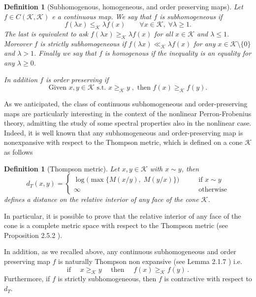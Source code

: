 \documentclass{article}
\newtheorem{definition}[theorem]{Definition}
\newcommand{\cone}{\mathcal{K}}
\newcommand{\distT}{d_T}
\newcommand{\cgeq}{\geq_{\cone}}
\newcommand{\cleq}{\leq_{\cone}}
\newcommand{\cll}{\ll_{\cone}}
\begin{document}
\begin{definition}[Subhomogenous, homogeneous, and order preserving maps]
Let $f\in C(\cone,\cone)$ e a continuous map. We say that $f$ is subhomogeneous if 
    $$f(\lambda x)\cleq \lambda f(x) \qquad \forall x\in \cone,\;\forall \lambda\geq 1.$$
    The last is equivalent to ask $f(\lambda x)\cgeq \lambda f(x)$ for all $x\in \cone$ and $\lambda\leq 1$. Moreover $f$ is strictly subhomogeneous if $f(\lambda x) \cll \lambda f(x)$ for any $x\in \cone\setminus\{0\}$ and $\lambda>1$. Finally we say that $f$ is homogenous if the inequality is an equality for any $\lambda\geq0$.

    In addition $f$ is order preserving if 
   $$ \text{Given } x,y\in \cone \text{ s.t. } x\cgeq y\;, \text{ then } f(x)\cgeq f(y).$$
    
\end{definition}

As we anticipated, the class of continuous subhomogeneous and order-preserving maps are particularly interesting in the context of the nonlinear Perron-Frobenius theory, admitting the study of some spectral properties also in the nonlinear case.
Indeed, it is well known that any subhomogeneous and order-preserving map is nonexpansive with respect to the Thompson metric, which is defined on a cone $\cone$ as follows
%
\begin{definition}[Thompson metric]
Let $x,y \in \cone$ with $x\sim y$, then 
\begin{equation}
\distT(x,y)=\begin{cases} \log\big(\max\{M(x/y),\;M(y/x)\}\big)\qquad &\text{if } x\sim y\\
\infty \qquad &\text{otherwise}
\end{cases} 
\end{equation}
defines a distance on the relative interior of any face of the cone $\cone$.
\end{definition}
%
In particular, it is possible to prove that the relative interior of any face of the cone is a complete metric space with respect to the Thompson metric (see Proposition 2.5.2 \cite{lemmens2012nonlinear}).
%

%
In addition, as we recalled above, any continuous subhomogeneous and order preserving map $f$ is naturally Thompson non expansive (see Lemma 2.1.7 \cite{lemmens2012nonlinear}) i.e.
\begin{equation}
    \text{if }\quad  x\cgeq y \quad \text{ then }\quad  f(x)\cgeq f(y) \, .
\end{equation}
%
Furthermore, if $f$ is strictly subhomogeneous, then $f$ is contractive with respect to $\distT$.
%
\end{document}
